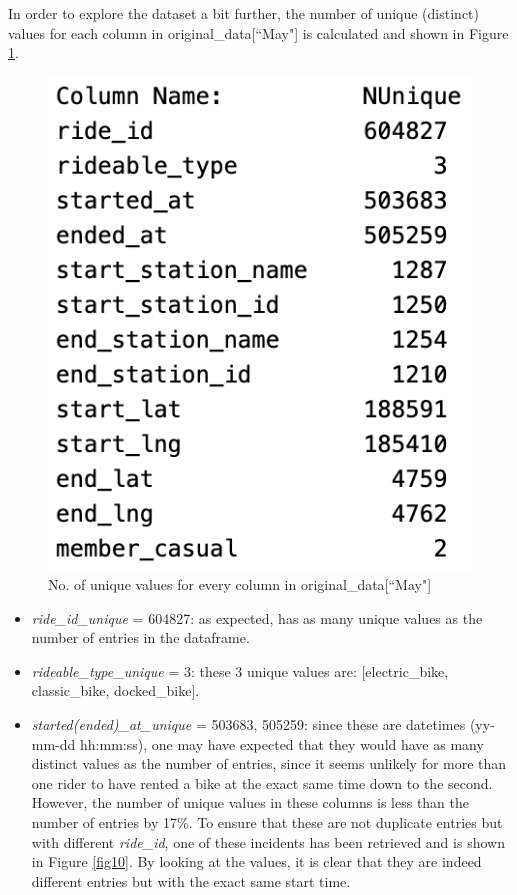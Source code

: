 \documentclass[12pt]{article}
\begin{document}
\begin{itemize}
In order to explore the dataset a bit further, the number of unique (distinct) values for each column in original\_data[``May"] is calculated and shown in Figure \ref{fig2}. 
	\begin{figure}[h]
	\centering
	\includegraphics[scale = 0.6]{imgUnique.png} %
	\caption{No. of unique values for every column in original\_data[``May"]}
	\label{fig2}
	\end{figure}
	
\begin{itemize}
	\item \textit{ride\_id\_unique}  = 604827: as expected, has as many unique values as the number of entries in the dataframe.
	\item \textit{rideable\_type\_unique} = 3: these 3 unique values are:  [electric\_bike, classic\_bike, docked\_bike].
	\item \textit{started(ended)\_at\_unique} = 503683,  505259: since these are datetimes (yy-mm-dd hh:mm:ss), one may have expected that they would have as many distinct values as the number of entries, since it seems unlikely for more than one rider to have rented a bike at the exact same time down to the second. However, the number of unique values in these columns is less than the number of entries by 17\%. To ensure that these are not duplicate entries but with different \textit{ride\_id}, one of these incidents has been retrieved and is shown in Figure \ref{fig10}. By looking at the values, it is clear that they are indeed different entries but with the exact same start time.
	

\end{itemize}
\end{itemize}
\end{document}
